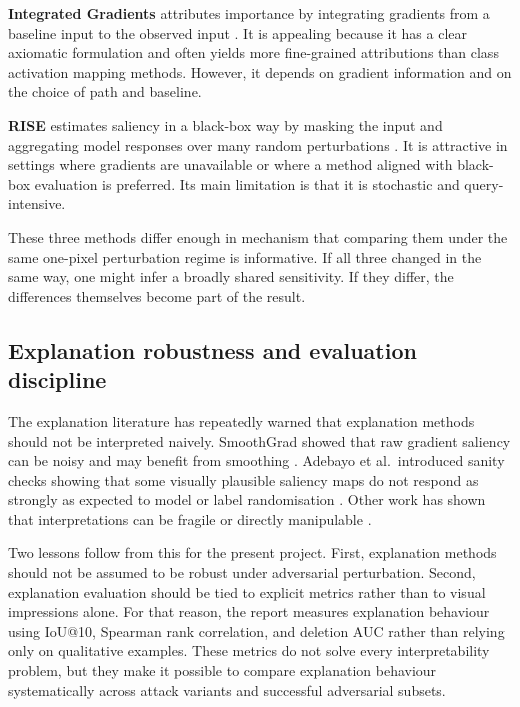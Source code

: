 \textbf{Integrated Gradients} attributes importance by integrating gradients from a baseline input to the observed input \cite{sundararajan2017ig}.
It is appealing because it has a clear axiomatic formulation and often yields more fine-grained attributions than class activation mapping methods.
However, it depends on gradient information and on the choice of path and baseline.

\textbf{RISE} estimates saliency in a black-box way by masking the input and aggregating model responses over many random perturbations \cite{petsiuk2018rise}.
It is attractive in settings where gradients are unavailable or where a method aligned with black-box evaluation is preferred.
Its main limitation is that it is stochastic and query-intensive.

These three methods differ enough in mechanism that comparing them under the same one-pixel perturbation regime is informative.
If all three changed in the same way, one might infer a broadly shared sensitivity.
If they differ, the differences themselves become part of the result.

\subsection{Explanation robustness and evaluation discipline}
The explanation literature has repeatedly warned that explanation methods should not be interpreted naively.
SmoothGrad showed that raw gradient saliency can be noisy and may benefit from smoothing \cite{smilkov2017smoothgrad}.
Adebayo et al.\ introduced sanity checks showing that some visually plausible saliency maps do not respond as strongly as expected to model or label randomisation \cite{adebayo2018sanity}.
Other work has shown that interpretations can be fragile or directly manipulable \cite{ghorbani2019fragile,alvarezmelis2018robustness,dombrowski2019explanations}.

Two lessons follow from this for the present project.
First, explanation methods should not be assumed to be robust under adversarial perturbation.
Second, explanation evaluation should be tied to explicit metrics rather than to visual impressions alone.
For that reason, the report measures explanation behaviour using IoU@10, Spearman rank correlation, and deletion AUC rather than relying only on qualitative examples.
These metrics do not solve every interpretability problem, but they make it possible to compare explanation behaviour systematically across attack variants and successful adversarial subsets.

